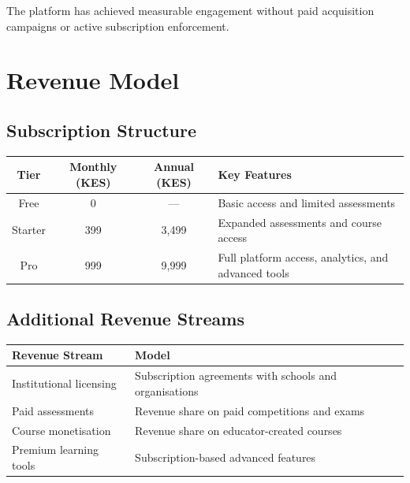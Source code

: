 \documentclass[a4paper,11pt]{article}
\begin{document}
The platform has achieved measurable engagement without paid acquisition campaigns or active subscription enforcement.

\section{Revenue Model}

\subsection*{Subscription Structure}

\begin{table}[h]
\centering
\begin{tabular}{@{}c c c p{5cm}@{}}
\toprule
\rowcolor{indigobg}
\textcolor{indigobrand}{\textbf{Tier}} &
\textcolor{indigobrand}{\textbf{Monthly (KES)}} &
\textcolor{indigobrand}{\textbf{Annual (KES)}} &
\textcolor{indigobrand}{\textbf{Key Features}} \\
\midrule
Free & 0 & — & Basic access and limited assessments \\
Starter & 399 & 3,499 & Expanded assessments and course access \\
Pro & 999 & 9,999 & Full platform access, analytics, and advanced tools \\
\bottomrule
\end{tabular}
\end{table}

\subsection*{Additional Revenue Streams}

\begin{table}[h]
\centering
\begin{tabular}{@{}p{} p{}@{}}
\toprule
\rowcolor{indigobg}
\textcolor{indigobrand}{\textbf{Revenue Stream}} & \textcolor{indigobrand}{\textbf{Model}} \\
\midrule
Institutional licensing & Subscription agreements with schools and organisations \\
Paid assessments & Revenue share on paid competitions and exams \\
Course monetisation & Revenue share on educator-created courses \\
Premium learning tools & Subscription-based advanced features \\
\bottomrule
\end{tabular}
\end{table}
\end{document}
